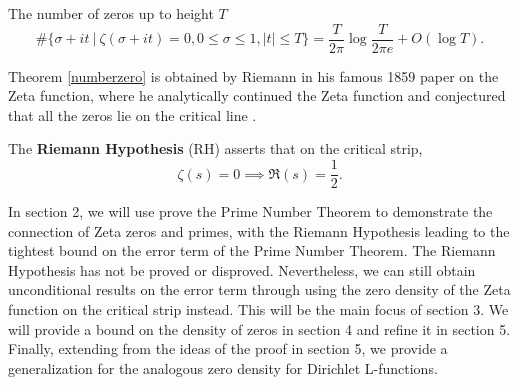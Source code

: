 \begin{theorem} \label{numberzero}
	The number of zeros up to height $T$\[
	\#\{\sigma+it \ | \ \zeta(\sigma+it)=0,0 \leq \sigma\leq 1, |t|\leq T \} = \frac{T}{2\pi}\log{\frac{T}{2\pi e}} + O(\log T).
	\]
\end{theorem}
Theorem \ref{numberzero} is obtained by Riemann in his famous 1859 paper on the Zeta function, where he analytically continued the Zeta function and conjectured that all the zeros lie on the critical line \cite{Riemann1859}.
\begin{conjecture} \label{RH}
	The \textbf{Riemann Hypothesis} (RH) asserts that on the critical strip, \[
	\zeta(s) = 0 \implies \Re(s) = \frac{1}{2}. 
	\]
\end{conjecture}
In section 2, we will use prove the Prime Number Theorem to demonstrate the connection of Zeta zeros and primes, with the Riemann Hypothesis leading to the tightest bound on the error term of the Prime Number Theorem. 
The Riemann Hypothesis has not be proved or disproved. Nevertheless, we can still obtain unconditional results on the error term through using the zero density of the Zeta function on the critical strip instead. This will be the main focus of section 3. We will provide a bound on the density of zeros in section 4 and refine it in section 5. Finally, extending from the ideas of the proof in section 5, we provide a generalization for the analogous zero density for Dirichlet L-functions.